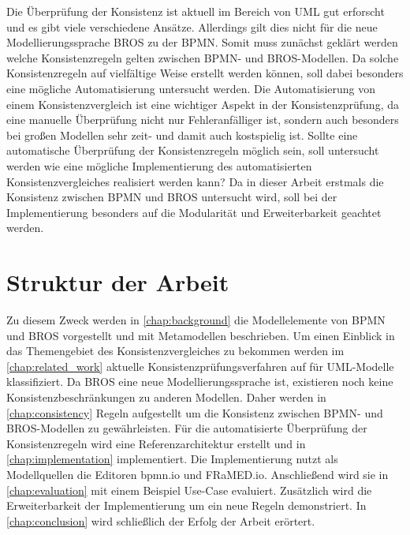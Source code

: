 Die Überprüfung der Konsistenz ist aktuell im Bereich von UML gut erforscht und es gibt viele verschiedene Ansätze.
Allerdings gilt dies nicht für die neue Modellierungssprache BROS zu der BPMN.
Somit muss zunächst geklärt werden welche Konsistenzregeln gelten zwischen BPMN- und BROS-Modellen.
Da solche Konsistenzregeln auf vielfältige Weise erstellt werden können, soll dabei besonders eine mögliche Automatisierung untersucht werden.
Die Automatisierung von einem Konsistenzvergleich ist eine wichtiger Aspekt in der Konsistenzprüfung, da eine manuelle Überprüfung nicht nur Fehleranfälliger ist, sondern auch besonders bei großen Modellen sehr zeit- und damit auch kostspielig ist.
Sollte eine automatische Überprüfung der Konsistenzregeln möglich sein, soll untersucht werden wie eine mögliche Implementierung des automatisierten Konsistenzvergleiches realisiert werden kann?
Da in dieser Arbeit erstmals die Konsistenz zwischen BPMN und BROS untersucht wird, soll bei der Implementierung besonders auf die Modularität und Erweiterbarkeit geachtet werden.

\section{Struktur der Arbeit}

Zu diesem Zweck werden in \cref{chap:background} die Modellelemente von BPMN und BROS vorgestellt und mit Metamodellen beschrieben.
Um einen Einblick in das Themengebiet des Konsistenzvergleiches zu bekommen werden im \cref{chap:related_work} aktuelle Konsistenzprüfungsverfahren auf für UML-Modelle klassifiziert.
Da BROS eine neue Modellierungssprache ist, existieren noch keine Konsistenzbeschränkungen zu anderen Modellen.
Daher werden in \cref{chap:consistency} Regeln aufgestellt um die Konsistenz zwischen BPMN- und BROS-Modellen zu gewährleisten.
Für die automatisierte Überprüfung der Konsistenzregeln wird eine Referenzarchitektur erstellt und in \cref{chap:implementation} implementiert.
Die Implementierung nutzt als Modellquellen die Editoren bpmn.io und FRaMED.io.
Anschließend wird sie in \cref{chap:evaluation} mit einem Beispiel Use-Case evaluiert.
Zusätzlich wird die Erweiterbarkeit der Implementierung um ein neue Regeln demonstriert.
In \cref{chap:conclusion} wird schließlich der Erfolg der Arbeit erörtert.
